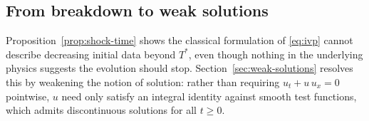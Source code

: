\subsection{From breakdown to weak solutions}
\label{subsec:shock-transition}

Proposition~\ref{prop:shock-time} shows the classical formulation of
\eqref{eq:ivp} cannot describe decreasing initial data beyond $T^*$, even
though nothing in the underlying physics suggests the evolution should
stop. Section~\ref{sec:weak-solutions} resolves this by weakening the
notion of solution: rather than requiring $u_t+u\,u_x=0$ pointwise, $u$
need only satisfy an integral identity against smooth test functions,
which admits discontinuous solutions for all $t \geq 0$.